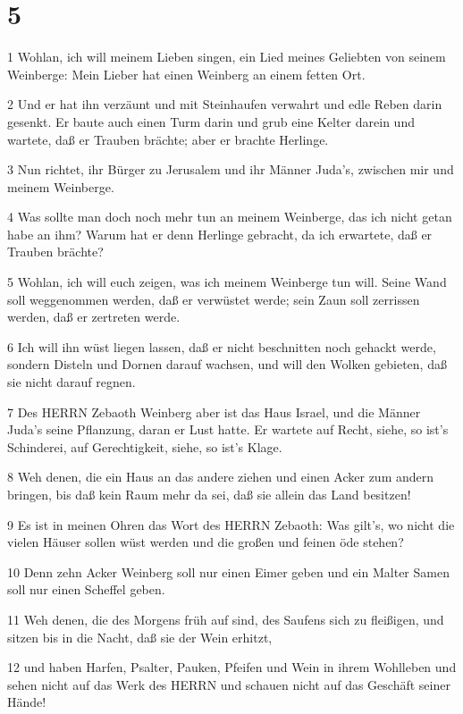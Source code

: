 \chapter{5}

\par 1 Wohlan, ich will meinem Lieben singen, ein Lied meines Geliebten von seinem Weinberge: Mein Lieber hat einen Weinberg an einem fetten Ort.
\par 2 Und er hat ihn verzäunt und mit Steinhaufen verwahrt und edle Reben darin gesenkt. Er baute auch einen Turm darin und grub eine Kelter darein und wartete, daß er Trauben brächte; aber er brachte Herlinge.
\par 3 Nun richtet, ihr Bürger zu Jerusalem und ihr Männer Juda's, zwischen mir und meinem Weinberge.
\par 4 Was sollte man doch noch mehr tun an meinem Weinberge, das ich nicht getan habe an ihm? Warum hat er denn Herlinge gebracht, da ich erwartete, daß er Trauben brächte?
\par 5 Wohlan, ich will euch zeigen, was ich meinem Weinberge tun will. Seine Wand soll weggenommen werden, daß er verwüstet werde; sein Zaun soll zerrissen werden, daß er zertreten werde.
\par 6 Ich will ihn wüst liegen lassen, daß er nicht beschnitten noch gehackt werde, sondern Disteln und Dornen darauf wachsen, und will den Wolken gebieten, daß sie nicht darauf regnen.
\par 7 Des HERRN Zebaoth Weinberg aber ist das Haus Israel, und die Männer Juda's seine Pflanzung, daran er Lust hatte. Er wartete auf Recht, siehe, so ist's Schinderei, auf Gerechtigkeit, siehe, so ist's Klage.
\par 8 Weh denen, die ein Haus an das andere ziehen und einen Acker zum andern bringen, bis daß kein Raum mehr da sei, daß sie allein das Land besitzen!
\par 9 Es ist in meinen Ohren das Wort des HERRN Zebaoth: Was gilt's, wo nicht die vielen Häuser sollen wüst werden und die großen und feinen öde stehen?
\par 10 Denn zehn Acker Weinberg soll nur einen Eimer geben und ein Malter Samen soll nur einen Scheffel geben.
\par 11 Weh denen, die des Morgens früh auf sind, des Saufens sich zu fleißigen, und sitzen bis in die Nacht, daß sie der Wein erhitzt,
\par 12 und haben Harfen, Psalter, Pauken, Pfeifen und Wein in ihrem Wohlleben und sehen nicht auf das Werk des HERRN und schauen nicht auf das Geschäft seiner Hände!
